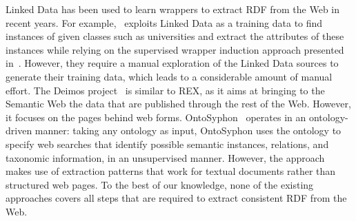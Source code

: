 
Linked Data has been used to learn wrappers to extract \ac{RDF} from the Web in recent years. 
For example,~\cite{Gentile2013} exploits Linked Data as a training data to find instances of given classes such as universities and extract the attributes of these instances while relying on the supervised wrapper induction approach presented in~\cite{Hao2011}. However, they require a manual exploration of the Linked Data sources to generate their training data, which leads to a considerable amount of manual effort.
%
The {\sc Deimos} project~\cite{conf/aaaiss/ParundekarKA10} is similar to REX, as it aims at bringing to the Semantic Web the data that are published through the rest of the Web. 
However, it focuses on the pages behind web forms.
%
%
OntoSyphon~\cite{DBLP:journals/ws/McDowellC08} operates in an ontology-driven manner: taking any ontology as input, OntoSyphon uses the ontology to specify web searches that identify possible semantic instances, relations, and taxonomic information, in an unsupervised manner. However, the approach makes use of extraction patterns that work for textual documents rather than structured web pages. %
To the best of our knowledge, none of the existing approaches covers all steps that are required to extract consistent \ac{RDF} from the Web. 
